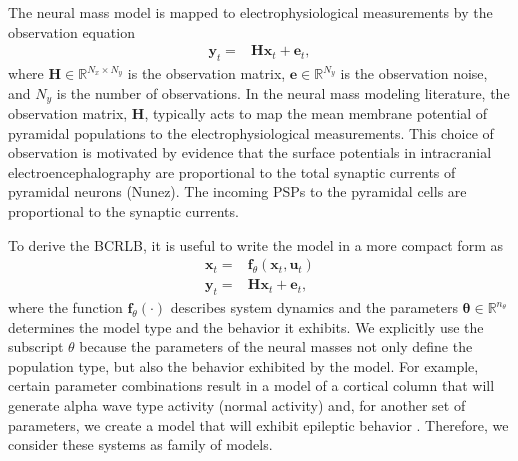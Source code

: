\documentclass{article}
\renewcommand{\vec}[1]{\ensuremath{{\boldsymbol #1}}}
\begin{document}
The neural mass model is mapped to electrophysiological measurements by the observation equation
\begin{align}
	\mathbf{y}_t =& \mathbf{H}\mathbf{x}_t + \mathbf{e}_t,
\end{align}
where $\mathbf{H}\in \mathbb{R}^{N_x \times N_y}$ is the observation matrix, $\mathbf{e}\in \mathbb{R}^{N_y}$ is the observation noise, and $N_y$ is the number of observations. In the neural mass modeling literature, the observation matrix, $\mathbf{H}$, typically acts to map the mean membrane potential of pyramidal populations to the electrophysiological measurements. This choice of observation is motivated by evidence that the surface potentials in intracranial electroencephalography are proportional to the total synaptic currents of pyramidal neurons (Nunez). The incoming PSPs to the pyramidal cells are proportional to the synaptic currents.

To derive the BCRLB, it is useful to write the model in a more compact form as
\begin{align}\label{eq:NeuralMassModel}
    \mathbf{x}_t =& \vec f_{\theta}\left(\mathbf{x}_t,\mathbf{u}_t\right)\\
    \mathbf{y}_t =& \mathbf{H}\mathbf{x}_t + \mathbf{e}_t,
\end{align}
where the function $\vec f_{\theta}(\cdot)$ describes system dynamics and the parameters $\boldsymbol{\theta} \in \mathbb{R}^{n_{\theta}}$ determines the model type and the behavior it exhibits. 
We explicitly use the subscript $\theta$ because the parameters of the neural masses not only define the population type, but also the behavior exhibited by the model. For example, certain parameter combinations result in a model of a cortical column that will generate alpha wave type activity (normal activity) and, for another set of parameters, we create a model that will exhibit epileptic behavior \cite{Wendling2002}. Therefore, we consider these systems as family of models. 
\end{document}
